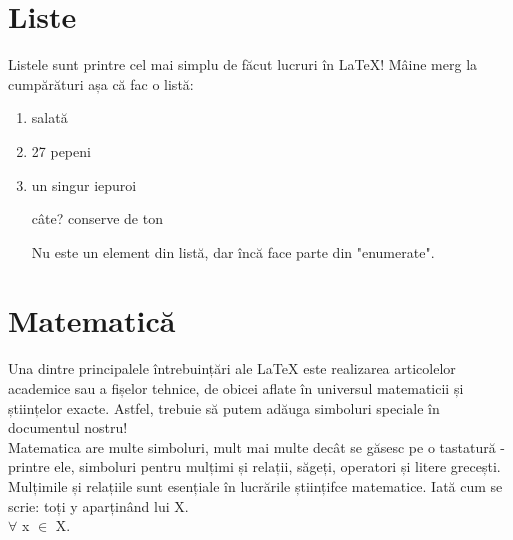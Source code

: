 \documentclass[12pt]{article}
\begin{document}
\section{Liste}
Listele sunt printre cel mai simplu de făcut lucruri în LaTeX! Mâine merg la
cumpărături așa că fac o listă:
\begin{enumerate} %
  \item salată
  \item 27 pepeni
  \item un singur iepuroi
  \item[câte?] conserve de ton

  Nu este un element din listă, dar încă face parte din "enumerate".

\end{enumerate} %

\section{Matematică}

Una dintre principalele întrebuințări ale LaTeX este realizarea
articolelor academice sau a fișelor tehnice, de obicei aflate în
universul matematicii și științelor exacte. Astfel, trebuie să putem
adăuga simboluri speciale în documentul nostru! \\

Matematica are multe simboluri, mult mai multe decât se găsesc
pe o tastatură - printre ele, simboluri pentru mulțimi și relații,
săgeți, operatori și litere grecești.\\

Mulțimile și relațiile sunt esențiale în lucrările științifce matematice.
Iată cum se scrie: toți y aparținând lui X.\\
$\forall$ x $\in$ X. \\

\end{document}
